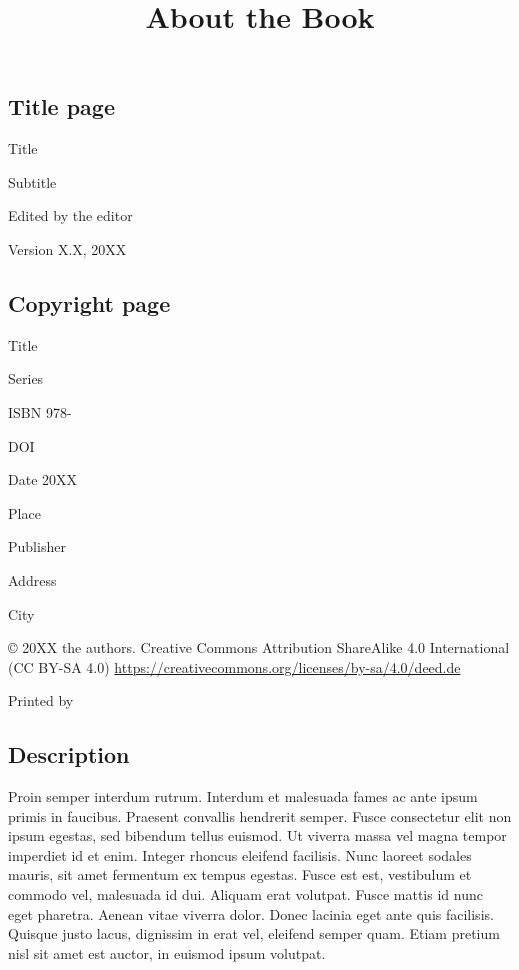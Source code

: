\documentclass{article}
\begin{document}
\title{About the Book}

\maketitle


\subsection{Title page}\label{H353005}



Title


Subtitle


Edited by the editor


Version X.X, 20XX


\subsection{Copyright page}\label{H5488342}



Title

Series

ISBN 978- 

DOI  

Date 20XX

Place  


Publisher

Address

City


© 20XX the authors. Creative Commons Attribution ShareAlike 4.0 International (CC BY-SA 4.0) \href{https://creativecommons.org/licenses/by-sa/4.0/deed.de}{https://creativecommons.org/licenses/by-sa/4.0/deed.de}

Printed by


\subsection{Description}\label{H8928019}



Proin semper interdum rutrum. Interdum et malesuada fames ac ante ipsum primis in faucibus. Praesent convallis hendrerit semper. Fusce consectetur elit non ipsum egestas, sed bibendum tellus euismod. Ut viverra massa vel magna tempor imperdiet id et enim. Integer rhoncus eleifend facilisis. Nunc laoreet sodales mauris, sit amet fermentum ex tempus egestas. Fusce est est, vestibulum et commodo vel, malesuada id dui. Aliquam erat volutpat. Fusce mattis id nunc eget pharetra. Aenean vitae viverra dolor. Donec lacinia eget ante quis facilisis. Quisque justo lacus, dignissim in erat vel, eleifend semper quam. Etiam pretium nisl sit amet est auctor, in euismod ipsum volutpat.
\end{document}
